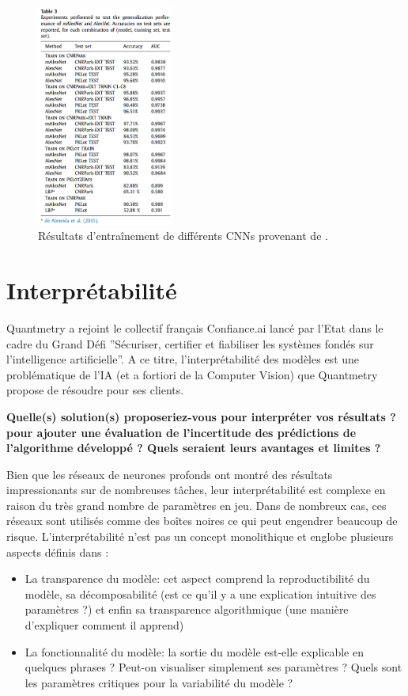 \documentclass[12pt]{article}
\begin{document}
\begin{figure}[htbp]
    \centering
    \includegraphics[width=0.4\textwidth]{figures/networks/amato2017_results.png}
    \caption{Résultats d'entraînement de différents CNNs provenant de \cite{Amato2017}.}
    \label{fig:amato2017_results}
\end{figure}

\section{Interprétabilité}

Quantmetry a rejoint le collectif français Confiance.ai lancé par l'Etat dans
le cadre du Grand Défi ”Sécuriser, certifier et fiabiliser les systèmes fondés
sur l'intelligence artificielle”. A ce titre, l'interprétabilité des modèles est une problématique de l'IA (et a fortiori de la Computer Vision) que Quantmetry
propose de résoudre pour ses clients.

\textbf{Quelle(s) solution(s) proposeriez-vous pour interpréter vos résultats ? pour ajouter une évaluation de l'incertitude des prédictions de l'algorithme
développé ? Quels seraient leurs avantages et limites ?}

Bien que les réseaux de neurones profonds ont montré des résultats impressionants sur de nombreuses tâches, leur interprétabilité est complexe en raison du très grand nombre de paramètres en jeu. Dans de nombreux cas, ces réseaux sont utilisés comme des boîtes noires ce qui peut engendrer beaucoup de risque. L'interprétabilité n'est pas un concept monolithique et englobe plusieurs aspects définis dans \cite{Chakraborty2017}:

\begin{itemize}
    \item La transparence du modèle: cet aspect comprend la reproductibilité du modèle, sa décomposabilité (est ce qu'il y a une explication intuitive des paramètres ?) et enfin sa transparence algorithmique (une manière d'expliquer comment il apprend)
    \item La fonctionnalité du modèle: la sortie du modèle est-elle explicable en quelques phrases ? Peut-on visualiser simplement ses paramètres ? Quels sont les paramètres critiques pour la variabilité du modèle ?
\end{itemize}
\end{document}
